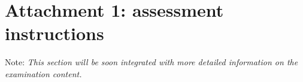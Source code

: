 \section*{Attachment 1: assessment instructions}

Note: \textit{This section will be soon integrated with more detailed information on the examination content.}

\begin{comment}
	\begin{tabular}{|p{3cm}|p{3.5cm}|p{6cm}|}
		\hline
		\textbf{Learning goal} & \textbf{Dublin descriptors} & \textbf{Tested through} \\
		\hline
		\texttt{KNOW} & 1 & Theoretical examination \\
		\hline
		\texttt{IMPL} & 2 & Practical examination \\
		\hline
		\texttt{AN} & 3 & Theoretical examination \\
		\hline
		\texttt{APP} & 2, 3 & Theoretical and practical examination \\
		\hline
	\end{tabular}
	
	\vspace{1cm}

	Dublin-descriptors:
	\begin{enumerate}
		\item Knowledge and understanding
		\item Applying knowledge and understanding
		\item Making judgements
		\item Communication
		\item Learning skills
	\end{enumerate}
\end{comment}